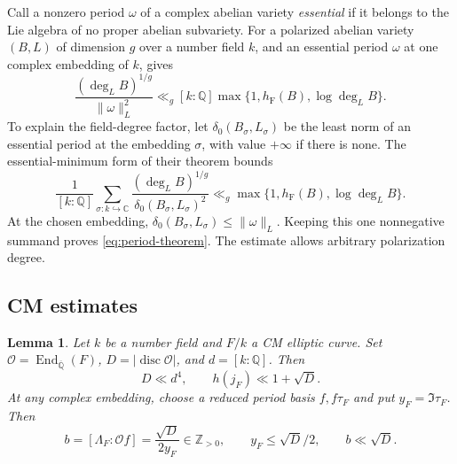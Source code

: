 \documentclass[11pt,a4paper]{article}
\numberwithin{equation}{section}
\newtheorem{lemma}[theorem]{Lemma}
\theoremstyle{definition}
\theoremstyle{remark}
\newcommand{\Q}{\mathbb Q}
\newcommand{\Z}{\mathbb Z}
\newcommand{\C}{\mathbb C}
\newcommand{\Qbar}{\overline{\mathbb Q}}
\newcommand{\End}{\operatorname{End}}
\newcommand{\disc}{\operatorname{disc}}
\newcommand{\hF}{h_{\mathrm F}}
\begin{document}
Call a nonzero period \(\omega\) of a complex abelian variety
\emph{essential} if it belongs to the Lie algebra of no proper
abelian subvariety. For a polarized abelian variety \((B,L)\) of
dimension \(g\) over a number field \(k\), and an essential period
\(\omega\) at one complex
embedding of \(k\), \cite[Theorem~1.2]{GR} gives
\begin{equation}\label{eq:period-theorem}
 \frac{(\deg_L B)^{1/g}}{\|\omega\|_L^2}
 \ll_g [k:\Q]\max\{1,\hF(B),\log\deg_L B\}.
\end{equation}
To explain the field-degree factor, let
\(\delta_0(B_\sigma,L_\sigma)\) be the least norm of an essential
period at the embedding \(\sigma\), with value \(+\infty\) if
there is none. The essential-minimum form of their theorem bounds
\[
 \frac1{[k:\Q]}\sum_{\sigma:k\hookrightarrow\C}
 \frac{(\deg_LB)^{1/g}}{\delta_0(B_\sigma,L_\sigma)^2}
 \ll_g \max\{1,\hF(B),\log\deg_LB\}.
\]
At the chosen embedding,
\(\delta_0(B_\sigma,L_\sigma)\le\|\omega\|_L\).
Keeping this one nonnegative summand proves
\eqref{eq:period-theorem}. The estimate allows arbitrary
polarization degree.

\subsection{CM estimates}\label{subsec:cm}

\begin{lemma}\label{lem:cm}
Let \(k\) be a number field and \(F/k\) a CM elliptic curve. Set
\(\mathcal O=\End_{\Qbar}(F)\), \(D=|\disc\mathcal O|\), and \(d=[k:\Q]\).
Then
\begin{equation}\label{eq:cm-bounds}
 D\ll d^4,\qquad h(j_F)\ll1+\sqrt D.
\end{equation}
At any complex embedding, choose a reduced period basis \(f,f\tau_F\)
and put \(y_F=\Im\tau_F\). Then
\begin{equation}\label{eq:b-index}
 b=[\Lambda_F:\mathcal O f]
   =\frac{\sqrt D}{2y_F}\in\Z_{>0},\qquad
 y_F\le\sqrt D/2,\qquad b\ll\sqrt D.
\end{equation}
\end{lemma}
\end{document}
